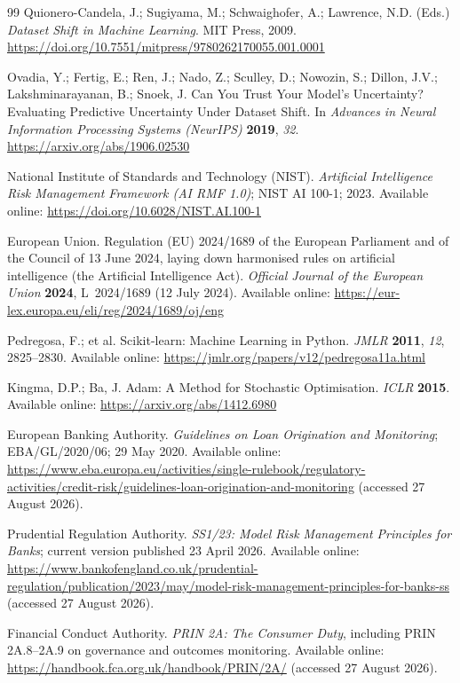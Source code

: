 \documentclass[10pt]{article}
\begin{document}
\begin{thebibliography}{99}
Quionero-Candela, J.; Sugiyama, M.; Schwaighofer, A.; Lawrence, N.D. (Eds.) \textit{Dataset Shift in Machine Learning}. MIT Press, 2009. \url{https://doi.org/10.7551/mitpress/9780262170055.001.0001}

Ovadia, Y.; Fertig, E.; Ren, J.; Nado, Z.; Sculley, D.; Nowozin, S.; Dillon, J.V.; Lakshminarayanan, B.; Snoek, J. Can You Trust Your Model's Uncertainty? Evaluating Predictive Uncertainty Under Dataset Shift. In \textit{Advances in Neural Information Processing Systems (NeurIPS)} \textbf{2019}, \textit{32}. \url{https://arxiv.org/abs/1906.02530}

National Institute of Standards and Technology (NIST). \textit{Artificial Intelligence Risk Management Framework (AI RMF 1.0)}; NIST AI 100-1; 2023. Available online: \url{https://doi.org/10.6028/NIST.AI.100-1}

European Union. Regulation (EU) 2024/1689 of the European Parliament and of the Council of 13 June 2024, laying down harmonised rules on artificial intelligence (the Artificial Intelligence Act). \textit{Official Journal of the European Union} \textbf{2024}, L~2024/1689 (12 July 2024). Available online: \url{https://eur-lex.europa.eu/eli/reg/2024/1689/oj/eng}

Pedregosa, F.; et al. Scikit-learn: Machine Learning in Python. \textit{JMLR} \textbf{2011}, \textit{12}, 2825--2830. Available online: \url{https://jmlr.org/papers/v12/pedregosa11a.html}

Kingma, D.P.; Ba, J. Adam: A Method for Stochastic Optimisation. \textit{ICLR} \textbf{2015}. Available online: \url{https://arxiv.org/abs/1412.6980}

European Banking Authority. \textit{Guidelines on Loan Origination and Monitoring}; EBA/GL/2020/06; 29 May 2020. Available online: \url{https://www.eba.europa.eu/activities/single-rulebook/regulatory-activities/credit-risk/guidelines-loan-origination-and-monitoring} (accessed 27 August 2026).

Prudential Regulation Authority. \textit{SS1/23: Model Risk Management Principles for Banks}; current version published 23 April 2026. Available online: \url{https://www.bankofengland.co.uk/prudential-regulation/publication/2023/may/model-risk-management-principles-for-banks-ss} (accessed 27 August 2026).

Financial Conduct Authority. \textit{PRIN 2A: The Consumer Duty}, including PRIN 2A.8--2A.9 on governance and outcomes monitoring. Available online: \url{https://handbook.fca.org.uk/handbook/PRIN/2A/} (accessed 27 August 2026).


\end{thebibliography}
\end{document}
